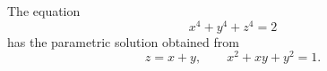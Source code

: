 \begin{proposition}\label{eq:156}
    The equation
\[
    x^4+y^4+z^4=2
\]
    has the parametric solution obtained from
\[
    z=x+y,\qquad x^2+xy+y^2=1.
\]
\end{proposition}
